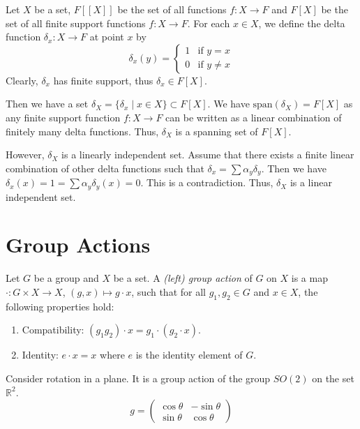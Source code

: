 \documentclass[
	11pt, %
	fleqn, %
	a4paper, %
]{LegrandOrangeBook}
\renewcommand{\span}[1]{\text{span}(#1)} %
\begin{document}
\begin{example}
    Let $X$ be a set, $F[[X]]$ be the set of all functions $f: X \to F$ and $F[X]$ be the set of all finite support functions $f: X \to F$. For each $x \in X$, we define the delta function $\delta_x : X \to F$ at point $x$ by 
    \[
        \delta_x(y) = \begin{cases}
            1 & \text{if } y = x \\
            0 & \text{if } y \neq x
        \end{cases}
    \]
    Clearly, $\delta_x$ has finite support, thus $\delta_x \in F[X]$.

    Then we have a set $\delta_X = \{\delta_x \mid x \in X\} \subset F[X]$. We have $\span{\delta_X} = F[X]$ as any finite support function $f: X \to F$ can be written as a linear combination of finitely many delta functions. Thus, $\delta_X$ is a spanning set of $F[X]$.

    However, $\delta_X$ is a linearly independent set. Assume that there exists a finite linear combination of other delta functions such that $\delta_x = \sum \alpha_y \delta_{y}$. Then we have $\delta_x(x) = 1 = \sum \alpha_y \delta_y(x) = 0$. This is a contradiction. Thus, $\delta_X$ is a linear independent set.
\end{example}

\newpage

\section{Group Actions}

\begin{definition}
    Let $G$ be a group and $X$ be a set. A \emph{(left) group action} of $G$ on $X$ is a map $\cdot : G \times X \to X$, $(g, x) \mapsto g \cdot x$, such that for all $g_1, g_2 \in G$ and $x \in X$, the following properties hold:
    \begin{enumerate}
        \item Compatibility: $(g_1 g_2) \cdot x = g_1 \cdot (g_2 \cdot x)$.
        \item Identity: $e \cdot x = x$ where $e$ is the identity element of $G$.
    \end{enumerate}
\end{definition}

Consider rotation in a plane. It is a group action of the group $SO(2)$ on the set $\mathbb{R}^2$.
\[
    g = \begin{pmatrix}
        \cos{\theta} & -\sin{\theta} \\
        \sin{\theta} & \cos{\theta}
    \end{pmatrix}
\]
\end{document}

